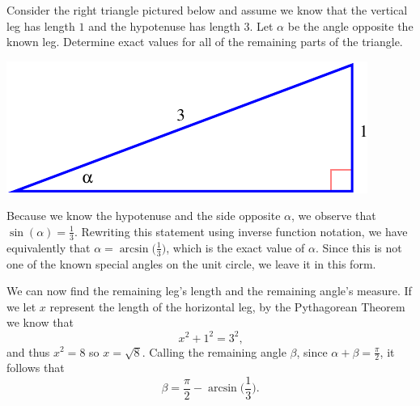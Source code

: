 \documentclass{ximera}
\begin{document}
\begin{example}
%
Consider the right triangle pictured below and assume we know that the vertical leg has length $1$ and the hypotenuse has length $3$.  Let $\alpha$ be the angle opposite the known leg.  Determine exact values for all of the remaining parts of the triangle.%
%
\begin{image}
\includegraphics[width=1\linewidth]{finding-angles-ex-1}
\end{image}

\begin{explanation}
Because we know the hypotenuse and the side opposite $\alpha$, we observe that $\sin(\alpha) = \frac{1}{3}$.  Rewriting this statement using inverse function notation, we have equivalently that $\alpha = \arcsin\!\bigg(\frac{1}{3}\bigg)$, which is the exact value of $\alpha$.  Since this is not one of the known special angles on the unit circle, we leave it in this form.%
\par
%
We can now find the remaining leg's length and the remaining angle's measure.  If we let $x$ represent the length of the horizontal leg, by the Pythagorean Theorem we know that
%
\begin{equation*}
x^2 + 1^2 = 3^2\text{,}
\end{equation*}
and thus $x^2 = 8$ so $x = \sqrt{8}$.  Calling the remaining angle $\beta$, since $\alpha + \beta = \frac{\pi}{2}$, it follows that
%
\begin{equation*}
\beta = \frac{\pi}{2} - \arcsin\!\bigg(\frac{1}{3}\bigg) \text{.}
\end{equation*}

\end{explanation}
\end{example}
\end{document}
